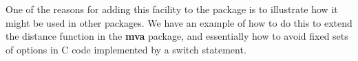\documentclass{article}
\def\SPackage#1{\textbf{#1}}
\begin{document}
One of the reasons for adding this facility to the package
is to illustrate how it might be used in other packages.
We have an example of how to do this to extend the distance 
function in the \SPackage{mva} package, and essentially
how to avoid fixed sets of options in C code implemented
by a switch statement.
\end{document}
